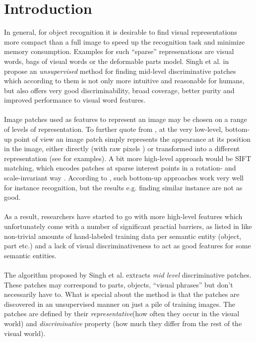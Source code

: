 \section{Introduction}

In general, for object recognition it is desirable to find visual representations more compact than a full image to 
speed up the recognition task and minimize memory consumption. Examples for such ``sparse'' represenations are visual words,
bags of visual words or the deformable parts model. Singh et al. in \cite{Singh2012DiscPat} propose an \textit{unsupervised} method for finding mid-level
discriminative patches which according to them is not only more intuitive and reasonable for humans, but also offers very good discriminability,
broad coverage, better purity and improved performance to visual word features.\\
\\
Image patches used as features to represent an image may be chosen on a range of levels of representation.
To further quote from \cite{Singh2012DiscPat}, at the very low-level, bottom-up point of view an image patch simply represents
the appearance at its position in the image, either directly (with raw pixels \cite{Ulman2002VisualFeatures}) or transformed into a different representation (see \cite{Singh2012DiscPat} for examples).
A bit more high-level approach would be SIFT matching, which encodes patches at sparse interest points in a rotation- and scale-invariant 
way \cite{Lowe2004SIFT}. According to \cite{Singh2012DiscPat}, such bottom-up approaches work very well for instance recognition, but the results 
e.g. finding similar instance are not as good.\\
\\
As a result, researchers have started to go with more high-level features which unfortunately come with a number of significant practial barriers,
as listed in \cite{Singh2012DiscPat} like non-trivial amounts of hand-labeled training data per semantic entity (object, part etc.) and a lack
of visual discriminativeness to act as good features for some semantic entities.\\
\\
The algorithm proposed by Singh et al. extracts \textit{mid level} discriminative patches. These patches may correspond to parts, objects, ``visual phrases''
but don't necessarily have to. What is special about the method is that the patches are discovered in an unsupervised manner on just a pile of training images.
The patches are defined by their \textit{representative}(how often they occur in the visual world) and \textit{discriminative} property (how much they differ from the rest of the visual world).
